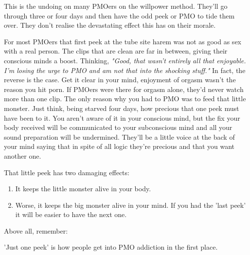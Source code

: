 \documentclass[easypeasy.tex]{subfiles}
\begin{document}
This is the undoing on many PMOers on the willpower method. They'll go through three or four days and then have the odd peek or PMO to tide them over. They don't realise the devastating effect this has on their morale. 

For most PMOers that first peek at the tube site harem was not as good as sex with a real person. The clips that are clean are far in between, giving their conscious minds a boost. Thinking, \textit{"Good, that wasn't entirely all that enjoyable. I'm losing the urge to PMO and am not that into the shocking stuff."} In fact, the reverse is the case. Get it clear in your mind, enjoyment of orgasm wasn't the reason you hit porn. If PMOers were there for orgasm alone, they'd never watch more than one clip. The only reason why you had to PMO was to feed that little monster. Just think, being starved four days, how precious that one peek must have been to it. You aren't aware of it in your conscious mind, but the fix your body received will be communicated to your subconscious mind and all your sound preparation will be undermined. They'll be a little voice at the back of your mind saying that in spite of all logic they're precious and that you want another one.

That little peek has two damaging effects:
\begin{enumerate}
  \item It keeps the little monster alive in your body.
  \item Worse, it keeps the big monster alive in your mind. If you had the 'last peek' it will be easier to have the next one.
\end{enumerate}

Above all, remember:

  {\huge 'Just one peek' is how people get into PMO addiction in the first place.}
\end{document}
